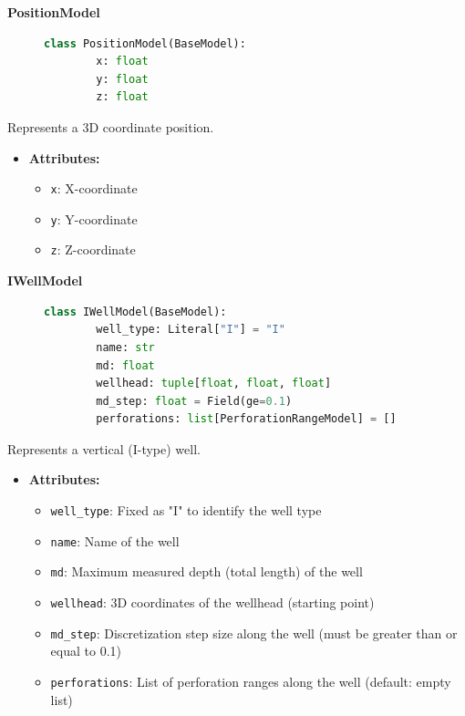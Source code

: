 \textbf{PositionModel}
\begin{figure}[H]
	\begin{lstlisting}[language=Python, caption=PositionModel class definition]
		class PositionModel(BaseModel):
		x: float
		y: float
		z: float
	\end{lstlisting}
\end{figure}

Represents a 3D coordinate position.

\begin{itemize}
	\item \textbf{Attributes:}
	\begin{itemize}
		\item \texttt{x}: X-coordinate
		\item \texttt{y}: Y-coordinate
		\item \texttt{z}: Z-coordinate
	\end{itemize}
\end{itemize}

\textbf{IWellModel}
\begin{figure}[H]
	\begin{lstlisting}[language=Python, caption=IWellModel class definition]
		class IWellModel(BaseModel):
		well_type: Literal["I"] = "I"
		name: str
		md: float
		wellhead: tuple[float, float, float]
		md_step: float = Field(ge=0.1)
		perforations: list[PerforationRangeModel] = []
	\end{lstlisting}
\end{figure}

Represents a vertical (I-type) well.

\begin{itemize}
	\item \textbf{Attributes:}
	\begin{itemize}
		\item \texttt{well\_type}: Fixed as "I" to identify the well type
		\item \texttt{name}: Name of the well
		\item \texttt{md}: Maximum measured depth (total length) of the well
		\item \texttt{wellhead}: 3D coordinates of the wellhead (starting point)
		\item \texttt{md\_step}: Discretization step size along the well (must be greater than or equal to 0.1)
		\item \texttt{perforations}: List of perforation ranges along the well (default: empty list)
	\end{itemize}
\end{itemize}

